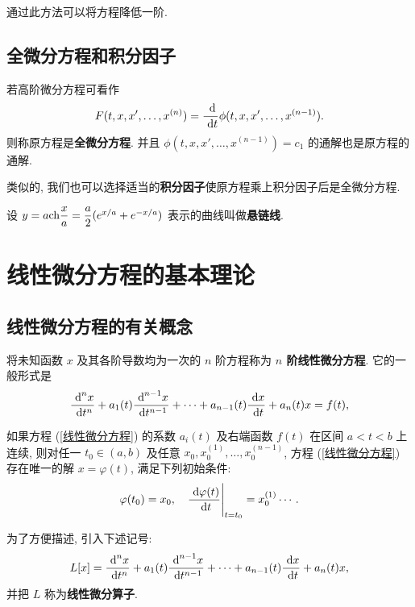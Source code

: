 通过此方法可以将方程降低一阶.

\subsection{全微分方程和积分因子}

\begin{definition}
	若高阶微分方程可看作 $$F(t,x,x',\ldots,x^{(n)})=\dfrac{\ \text {d}}{\ \text {d} t}\phi(t,x,x',\ldots,x^{(n-1)}).$$
	则称原方程是\textbf{全微分方程}. 并且 $\phi(t,x,x',\ldots,x^{(n-1)})=c_1$ 的通解也是原方程的通解.

	类似的, 我们也可以选择适当的\textbf{积分因子}使原方程乘上积分因子后是全微分方程.
\end{definition}

\begin{example}
	设 $y=a\text {ch}\dfrac x a=\dfrac a 2(e^{x/a}+e^{-x/a})$ 表示的曲线叫做\textbf{悬链线}.
\end{example}

\section{线性微分方程的基本理论}

\subsection{线性微分方程的有关概念}

\begin{definition}
	将未知函数 $x$ 及其各阶导数均为一次的 $n$ 阶方程称为 \textbf{$n$ 阶线性微分方程}. 它的一般形式是
	\begin{equation}\label{线性微分方程}
		\dfrac{\ \text {d}^n x}{\ \text {d} t^n}+a_1(t)\dfrac{\ \text {d}^{n-1}x}{\ \text {d} t^{n-1}}+\cdots+a_{n-1}(t)\dfrac{\ \text {d} x}{\ \text {d} t}+a_n(t)x=f(t),
	\end{equation}
\end{definition}

\begin{theorem}
	如果方程 (\ref{线性微分方程}) 的系数 $a_i(t)$ 及右端函数 $f(t)$ 在区间 $a<t<b$ 上连续, 则对任一 $t_0\in(a,b)$ 及任意 $x_0,x_0^{(1)},\ldots,x_0^{(n-1)}$, 方程 (\ref{线性微分方程}) 存在唯一的解 $x=\varphi(t)$, 满足下列初始条件:
	$$\varphi(t_0)=x_0,\quad \frac{\ \text {d}\varphi(t)}{\ \text {d} t}\Bigg|_{t=t_0}=x_0^{(1)}\cdots.$$
\end{theorem}

为了方便描述, 引入下述记号:
\begin{equation}\label{线性微分算子}
	L[x] = \frac{\ \text {d}^n x}{\ \text {d} t^n}+a_1(t)\frac{\ \text {d}^{n-1}x}{\ \text {d} t^{n-1}}+\cdots+a_{n-1}(t)\frac{\ \text {d} x}{\ \text {d} t}+a_n(t)x,
\end{equation}
并把 $L$ 称为\textbf{线性微分算子}.

